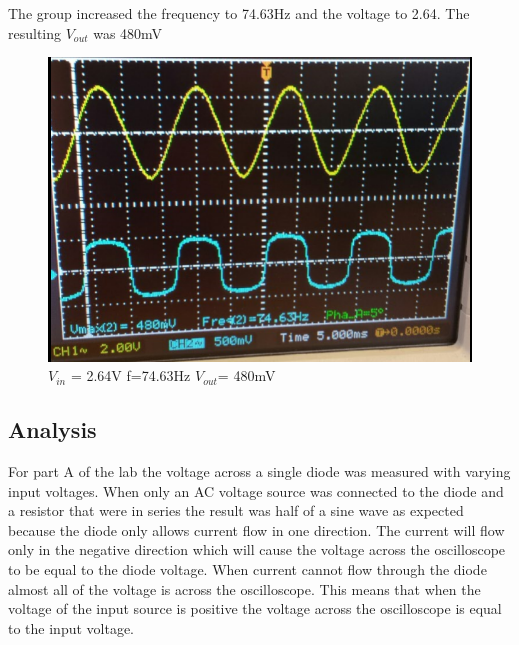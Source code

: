 \documentclass[twocolumn, amsmath]{revtex4}
\begin{document}



The group increased the frequency to 74.63Hz and the voltage to 2.64. The resulting $V_{out}$ was 480mV

\begin{figure}
    \includegraphics[scale=0.3]{480mV.png}  
    \caption{$V_{in}$ = 2.64V f=74.63Hz $V_{out}$= 480mV}
\end{figure}







 
\subsection{Analysis}
For part A of the lab the voltage across a single diode was measured with varying input voltages. When only an AC voltage source was connected to the diode and a resistor that were in series the result was half of a sine wave as expected because the diode only allows current flow in one direction. The current will flow only in the negative direction which will cause the voltage across the oscilloscope to be equal to the diode voltage. When current cannot flow through the diode almost all of the voltage is across the oscilloscope. This means that when the voltage of the input source is positive the voltage across the oscilloscope is equal to the input voltage. 
\end{document}
